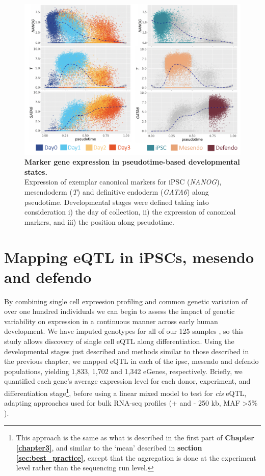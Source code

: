 \begin{figure}[h]
\centering
\includegraphics[width=14cm]{Chapter4/Fig/endodiff_stages.png}
\caption[Developmental stages]{\textbf{Marker gene expression in pseudotime-based developmental states.}\\
Expression of exemplar canonical markers for iPSC (\textit{NANOG}), mesendoderm (\textit{T}) and definitive endoderm (\textit{GATA6}) along pseudotime.
Developmental stages were defined taking into consideration i) the day of collection, ii) the expression of canonical markers, and iii) the position along pseudotime.}
\label{fig:endodiff_stages}
\end{figure}

\section{Mapping eQTL in iPSCs, mesendo and defendo}
\label{sec:endodiff_eqtl}

By combining single cell expreesion profiling and common genetic variation of over one hundred individuals we can begin to assess the impact of genetic variability on expression in a continuous manner across early human development.
We have imputed genotypes for all of our 125 samples \cite{kilpinen2017common}, so this study allows discovery of single cell eQTL along differentiation. 
Using the developmental stages just described and methods similar to those described in the previous chapter, we mapped eQTL in each of the \gls{ipsc}, mesendo and defendo populations, yielding 1,833, 1,702 and 1,342 eGenes, respectively. 
Briefly, we quantified each gene’s average expression level for each donor, experiment, and differentiation stage\footnote{This approach is the same as what is described in the first part of \textbf{Chapter \ref{chapter3}}, and similar to the `mean' described in \textbf{section \ref{sec:best_practice}}, except that the aggregation is done at the experiment level rather than the sequencing run level.}, before using a linear mixed model to test for \textit{cis} eQTL, adapting approaches used for bulk RNA-seq profiles (+ and - 250 kb, MAF >5\% \cite{kilpinen2017common}).\\


